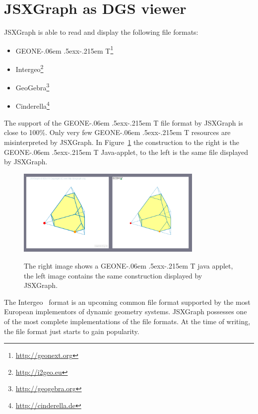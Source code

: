 \documentclass[12pt,a4paper]{article}%
\def\GEONExT{GEONE\kern-.06em \lower.5ex\hbox{x}\kern-.215em T}
\begin{document}
\section{JSXGraph as DGS viewer}
JSXGraph is able to read and display the following file formats:
\begin{itemize} 
\item \GEONExT{}\footnote{\href{http://geonext.org}{http://geonext.org}} 	
	\cite{ehmann2003,ehmann2008}
\item Intergeo\footnote{\href{http://i2geo.eu}{http://i2geo.eu}} \cite{kortenkamp2009}
\item GeoGebra\footnote{\href{geogebra.org}{http://geogebra.org}} \cite{hohenwarter2005}
\item Cinderella\footnote{\href{http://cinderella.de}{http://cinderella.de}} \cite{kortenkamp1999}
\end{itemize}
The support of the \GEONExT{} file format by JSXGraph is close to 100\%. 
Only very few \GEONExT{} resources are misinterpreted by JSXGraph. 
In Figure~\ref{fig:geonext} the construction to the right is the \GEONExT{} Java-applet, to the left is the same file displayed by JSXGraph.
\begin{figure}[ht]
\begin{center}
\includegraphics[width=0.8\textwidth]{geonext.png}\\
\caption{The right image shows a \GEONExT{} java applet, 
the left image contains the same construction displayed 
by JSXGraph.}\label{fig:geonext}
\end{center}
\end{figure}

The Intergeo~\cite{kortenkamp2009} format is an upcoming common file format supported by the most European implementors of dynamic geometry systems. JSXGraph possesses one of the most complete  implementations of the file formats. At the time of writing, the file format just starts to gain popularity. 
\end{document}
